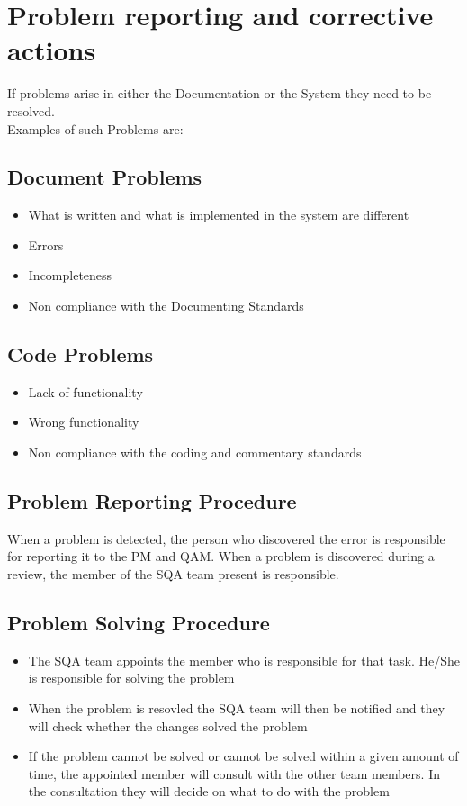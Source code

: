 \documentclass{report}
\begin{document}
\section{Problem reporting and corrective actions}
If problems arise in either the Documentation or the System they need to be resolved. \\
Examples of such Problems are:
\subsection*{Document Problems}
\begin{itemize}
\item What is written and what is implemented in the system are different
\item Errors
\item Incompleteness
\item Non compliance with the Documenting Standards
\end{itemize}
\subsection*{Code Problems}
\begin{itemize}
\item Lack of functionality
\item Wrong functionality
\item Non compliance with the coding and commentary standards
\end{itemize}
\subsection*{Problem Reporting Procedure}
When a problem is detected, the person who discovered the error is responsible for reporting it to the PM and QAM. When a problem is discovered during a review, the member of the SQA team present is responsible.
\subsection*{Problem Solving Procedure}
\begin{itemize}
\item The SQA team appoints the member who is responsible for that task. He/She is responsible for solving the problem
\item When the problem is resovled the SQA team will then be notified and they will check whether the changes solved the problem
\item If the problem cannot be solved or cannot be solved within a given amount of time, the appointed member will consult with the other team members. In the consultation they will decide on what to do with the problem
\end{itemize}
\end{document}
